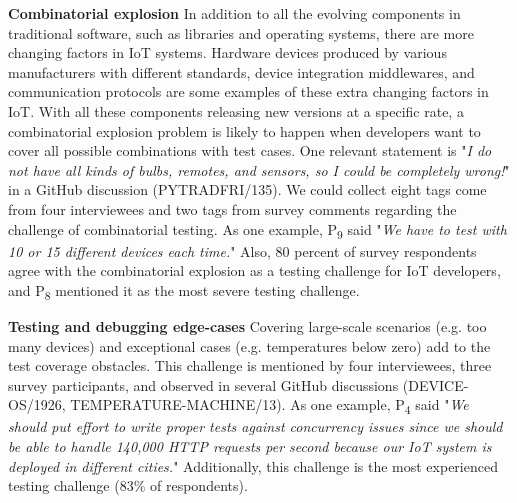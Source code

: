 {\textbf{Combinatorial explosion}
In addition to all the evolving components in traditional software, such as libraries and operating systems, there are more changing factors in IoT systems. Hardware devices produced by various manufacturers with different standards, device integration middlewares, and communication protocols are some examples of these extra changing factors in IoT. With all these components releasing new versions at a specific rate, a combinatorial explosion problem is likely to happen when developers want to cover all possible combinations with test cases.
One relevant statement is "\emph{I do not have all kinds of bulbs, remotes, and sensors, so I could be completely wrong!}" in a GitHub discussion (PYTRADFRI/135). We could collect eight tags come from four interviewees and two tags from survey comments regarding the challenge of combinatorial testing. As one example, P\textsubscript{9} said "\emph{We have to test with 10 or 15 different devices each time.}" Also, 80 percent of survey respondents agree with the combinatorial explosion as a testing challenge for IoT developers, and P\textsubscript{8} mentioned it as the most severe testing challenge. 

\textbf{Testing and debugging edge-cases}
Covering large-scale scenarios (e.g. too many devices) and exceptional cases (e.g. temperatures below zero) add to the test coverage obstacles. This challenge is mentioned by four interviewees, three survey participants, and observed in several GitHub discussions (DEVICE-OS/1926, TEMPERATURE-MACHINE/13). As one example, P\textsubscript{4} said "\emph{We should put effort to write proper tests against concurrency issues since we should be able to handle 140,000 HTTP requests per second because our IoT system is deployed in different cities.}" Additionally, this challenge is the most experienced testing challenge (83\% of respondents). 



}
